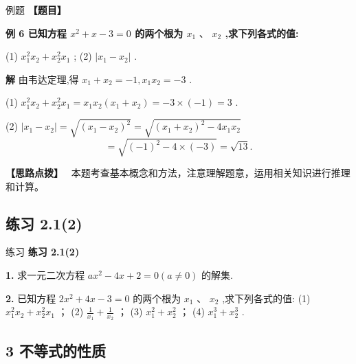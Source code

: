 \documentclass[a4paper,10pt,oneside,fontset=none]{ctexbook}
\newcounter{example}[chapter]
\newenvironment{example}[1][]{\begin{exBox}{例题}{#1}}{\end{exBox}}
\newenvironment{exercise}[1][]{\begin{exBox}{练习}{#1}}{\end{exBox}}
\numberwithin{equation}{chapter}
\newenvironment{solution}{\begin{solutionBox}}{\end{solutionBox}}
\newenvironment{hint}{\begin{hintBox}\textbf{【思路点拨】}~}{\end{hintBox}}
\begin{document}
\begin{example}
\textbf{【题目】}\par\vspace{0.3em}
\textbf{例 6 已知方程 ${x}^{2} + x - 3 = 0$ 的两个根为 ${x}_{1}\text{ 、 }{x}_{2}$ ,求下列各式的值:}\par\vspace{0.3em}
\par
(1)  ${x}_{1}^{2}{x}_{2} + {x}_{2}^{2}{x}_{1}$ ; (2) $\left| {{x}_{1} - {x}_{2}}\right|$ .
\end{example}

\begin{solution}
\textbf{解}
由韦达定理,得 ${x}_{1} + {x}_{2} =  - 1,{x}_{1}{x}_{2} =  - 3$ .
\par
(1)  ${x}_{1}^{2}{x}_{2} + {x}_{2}^{2}{x}_{1} = {x}_{1}{x}_{2}\left( {{x}_{1} + {x}_{2}}\right)  =  - 3 \times  \left( {-1}\right)  = 3$ .
\par
(2)  $\left| {{x}_{1} - {x}_{2}}\right|  = \sqrt{{\left( {x}_{1} - {x}_{2}\right) }^{2}} = \sqrt{{\left( {x}_{1} + {x}_{2}\right) }^{2} - 4{x}_{1}{x}_{2}}$
$$
= \sqrt{{\left( -1\right) }^{2} - 4 \times  \left( {-3}\right) } = \sqrt{13}.
$$
\end{solution}

\begin{hint}
本题考查基本概念和方法，注意理解题意，运用相关知识进行推理和计算。
\end{hint}

\subsection*{练习 2.1(2)}

\begin{exercise}
\textbf{练习 2.1(2)}\par\vspace{0.5em}
\textbf{1.} 求一元二次方程 $a{x}^{2} - {4x} + 2 = 0\left( {a \neq  0}\right)$ 的解集.
\par\vspace{0.8em}
\textbf{2.} 已知方程 $2{x}^{2} + {4x} - 3 = 0$ 的两个根为 ${x}_{1}\text{ 、 }{x}_{2}$ ,求下列各式的值: (1) ${x}_{1}^{2}{x}_{2} + {x}_{2}^{2}{x}_{1}$ ； (2) $\frac{1}{{x}_{1}} + \frac{1}{{x}_{2}}$ ； (3) ${x}_{1}^{2} + {x}_{2}^{2}$ ； (4) ${x}_{1}^{3} + {x}_{2}^{3}$ .
\end{exercise}

\subsection{3 不等式的性质}
\end{document}
